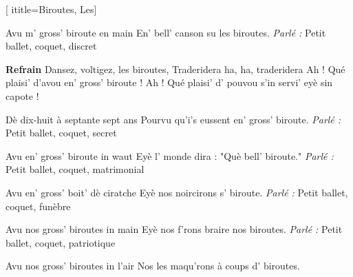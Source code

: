 [
  ititle={Biroutes, Les}]
  
\beginverse
{}
Avu m' gross' biroute en main
En' bell' canson su les biroutes.
\textit{Parlé :} Petit ballet, coquet, discret
\endverse

\beginchorus
\textbf{Refrain}
Dansez, voltigez, les biroutes,
Traderidera ha, ha, traderidera
Ah ! Qué plaisi' d'avou en' gross' biroute !
Ah ! Qué plaisi' d' pouvou s'in servi' eyè sin capote !
\endchorus

\beginverse
{}
Dè dix-huit à septante sept ans
Pourvu qu'i's eussent en' gross' biroute.
\textit{Parlé :} Petit ballet, coquet, secret
\endverse

\beginverse
{}
Avu en' gross' biroute in waut
Eyè l' monde dira : "Què bell' biroute."
\textit{Parlé :} Petit ballet, coquet, matrimonial
\endverse

\beginverse
{}
Avu en' gross' boit' dè ciratche
Eyè nos noircirons s' biroute.
\textit{Parlé :} Petit ballet, coquet, funèbre
\endverse

\beginverse
{}
Avu nos gross' biroutes in main
Eyè nos f'rons braire nos biroutes.
\textit{Parlé :} Petit ballet, coquet, patriotique
\endverse

\beginverse
{}
Avu nos gross' biroutes in l'air
Nos les maqu'rons à coups d' biroutes.
\endverse

\endsong
